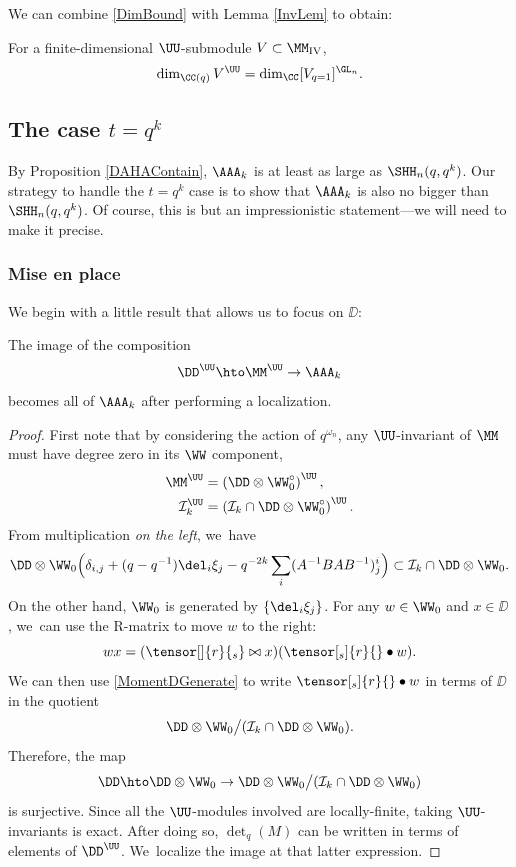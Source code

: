 We can combine \eqref{DimBound} with Lemma \ref{InvLem} to obtain:
\begin{prop}\label{DInvProp}
For a finite-dimensional $\UU$-submodule $V\subset\MM_{\mathrm{IV}}$,
\begin{equation}
\dim_{\CC(q)} V^\UU = \dim_\CC[ V_{q=1}]^{\GL_n}.
\label{InvBound}
\end{equation}
\end{prop}

\subsection{The case $t=q^k$}\label{qkCase}
By Proposition \ref{DAHAContain}, $\AAA_k$ is at least as large as $\SHH_n(q,q^k)$.
Our strategy to handle the $t=q^k$ case is to show that $\AAA_k$ is also no bigger than $\SHH_n(q,q^k)$.
Of course, this is but an impressionistic statement---we will need to make it precise.

\subsubsection{Mise en place}
We begin with a little result that allows us to focus on $\DD$:

\begin{lem}\label{DGenerate}
The image of the composition
\[
\DD^\UU\hto\MM^\UU\to\AAA_k
\]
becomes all of $\AAA_k$ after performing a localization.
\end{lem}

\begin{proof}
First note that by considering the action of $q^{\omega_n}$, any $\UU$-invariant of $\MM$ must have degree zero in its $\WW$ component, \ie
\begin{align*}
\MM^\UU&=\left(\DD\otimes\WW_0^\circ \right)^\UU,\\
\mathcal{I}_k^\UU&= \left(\mathcal{I}_k\cap\DD\otimes\WW_0^\circ \right)^\UU.
\end{align*}
From multiplication \textit{on the left}, we~have
\begin{equation}
\DD\otimes\WW_0\Bigl(\delta_{i,j}+(q-q^{-1})\del_i\xi_j -q^{-2k}\sum_i(A^{-1}BAB^{-1})_j^i\Bigr)\subset\mathcal{I}_k\cap\DD\otimes\WW_0.
\label{MomentDGenerate}
\end{equation}
On the other hand, $\WW_0$ is generated by $\{\del_i\xi_j\}$.
For any $w\in\WW_0$ and $x\in\DD$, we~can use the R-matrix to move $w$ to the right:
\[
wx=(\tensor[]{r}{_s}\bowtie x)(\tensor[_s]{r}{}\bullet w).
\]
We can then use \eqref{MomentDGenerate} to write $\tensor[_s]{r}{}\bullet w$ in terms of $\DD$ in the quotient
\[
\DD\otimes\WW_0\big/(\mathcal{I}_k\cap\DD\otimes\WW_0).
\]
Therefore, the map
\[
\DD\hto\DD\otimes\WW_0\to\DD\otimes\WW_0\big/(\mathcal{I}_k\cap\DD\otimes\WW_0)
\]
is surjective.
Since all the $\UU$-modules involved are locally-finite, taking $\UU$-invariants is exact.
After doing so, $\det_q(M)$ can be written in terms of elements of $\DD^\UU$. We~localize the image at that latter expression.
\end{proof}

